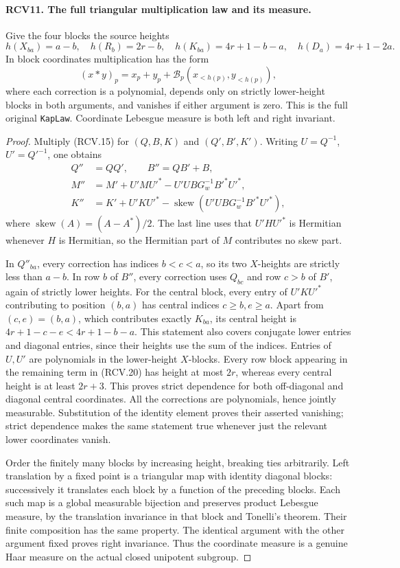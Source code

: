 \paragraph{RCV11. The full triangular multiplication law and its measure.}
\label{claim:RCV11}
Give the four blocks the source heights
\[
 h(X_{ba})=a-b,\quad h(R_b)=2r-b,\quad
 h(K_{ba})=4r+1-b-a,\quad h(D_a)=4r+1-2a.
\tag{RCV.18}
\]
In block coordinates multiplication has the form
\[
       (x*y)_p=x_p+y_p+\mathcal B_p(x_{<h(p)},y_{<h(p)}),
\tag{RCV.19}
\]
where each correction is a polynomial, depends only on strictly
lower-height blocks in both arguments, and vanishes if either
argument is zero.  This is the full original \texttt{KapLaw}.
Coordinate Lebesgue measure is both left and right invariant.
\begin{proof}
Multiply (RCV.15) for \((Q,B,K)\) and \((Q',B',K')\).
Writing \(U=Q^{-1}\), \(U'=Q'^{-1}\), one obtains
\[
 \begin{split}
 Q''&=QQ',\qquad B''=QB'+B,\\
 M''&=M'+U'MU'^*-U'UBG_w^{-1}B'^*U'^*,\\
 K''&=K'+U'KU'^*-\operatorname{skew}
                         (U'UBG_w^{-1}B'^*U'^*),
 \end{split}
\tag{RCV.20}
\]
where \(\operatorname{skew}(A)=(A-A^*)/2\).  The last line
uses that \(U'HU'^*\) is Hermitian whenever \(H\) is Hermitian,
so the Hermitian part of \(M\) contributes no skew part.

In \(Q''_{ba}\), every correction has indices \(b<c<a\),
so its two \(X\)-heights are strictly less than \(a-b\).
In row \(b\) of \(B''\), every correction uses \(Q_{bc}\)
and row \(c>b\) of \(B'\), again of strictly lower heights.
For the central block, every entry of \(U'KU'^*\) contributing
to position \((b,a)\) has central indices \(c\geq b,e\geq a\).
Apart from \((c,e)=(b,a)\), which contributes exactly \(K_{ba}\),
its central height is \(4r+1-c-e<4r+1-b-a\).  This statement
also covers conjugate lower entries and diagonal entries, since their
heights use the sum of the indices.  Entries of \(U,U'\) are
polynomials in the lower-height \(X\)-blocks.  Every row block
appearing in the remaining term in (RCV.20) has height at most
\(2r\), whereas every central height is at least \(2r+3\).
This proves strict dependence for both off-diagonal and diagonal
central coordinates.  All the corrections are polynomials, hence
jointly measurable.  Substitution of the identity element proves
their asserted vanishing; strict dependence makes the same statement
true whenever just the relevant lower coordinates vanish.

Order the finitely many blocks by increasing height, breaking ties
arbitrarily.  Left translation by a fixed point is a triangular
map with identity diagonal blocks: successively it translates each
block by a function of the preceding blocks.  Each such map is a
global measurable bijection and preserves product Lebesgue measure,
by the translation invariance in that block and Tonelli's theorem.
Their finite composition has the same property.  The identical
argument with the other argument fixed proves right invariance.
Thus the coordinate measure is a genuine Haar measure on the actual
closed unipotent subgroup.
\end{proof}
